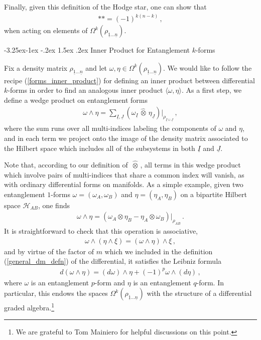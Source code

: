 \documentclass[12pt]{article}
\makeatletter
\newcommand{\ul}[1]{{\underline{#1}}}
\renewcommand\subsection{\@startsection{subsection}{2}{\z@}%
                                     {-3.25ex\@plus -1ex \@minus -.2ex}%
                                     {1.5ex \@plus .2ex}%
                                     {\normalfont\bfseries}}
\newcommand{\wotimes}{ \, \widehat{\otimes} \, }
\numberwithin{equation}{section}
\newcommand{\rhooneton}{{\rho_{\ul{1} \ldots \ul{n}}}}
\makeatother
\begin{document}
Finally, given this definition of the Hodge star, one can show that
%
\begin{align}
    \ast \ast = ( -1 )^{k ( n - k )} \, ,
\end{align}
%
when acting on elements of $\Omega^k ( \rhooneton )$.

\subsection{Inner Product for Entanglement $k$-forms}

Fix a density matrix $\rhooneton$ and let $\omega, \eta \in \Omega^k ( \rhooneton )$. We would like to follow the recipe (\ref{forms_inner_product}) for defining an inner product between differential $k$-forms in order to find an analogous inner product $\langle \omega , \eta \rangle$. As a first step, we define a wedge product on entanglement forms
%
\begin{align}
    \omega \wedge \eta = \sum_{\ul{I} , \ul{J}} \left( \omega_{\ul{I}} \wotimes \eta_{\ul{J}} \right) \big\vert_{\rho_{\ul{I} \cup \ul{J} }} \, ,
\end{align}
%
where the sum runs over all multi-indices labeling the components of $\omega$ and $\eta$, and in each term we project onto the image of the density matrix associated to the Hilbert space which includes all of the subsystems in both $\ul{I}$ and $\ul{J}$.

Note that, according to our definition of $\wotimes$, all terms in this wedge product which involve pairs of multi-indices that share a common index will vanish, as with ordinary differential forms on manifolds. As a simple example, given two entanglement $1$-forms $\omega = ( \omega_A , \omega_B )$ and $\eta = ( \eta_A , \eta_B )$ on a bipartite Hilbert space $\mathcal{H}_{AB}$, one finds
%
\begin{align}
    \omega \wedge \eta = \left( \omega_A \otimes \eta_B - \eta_A \otimes \omega_B \right) \big\vert_{\rho_{AB}} \, .
\end{align}
%
It is straightforward to check that this operation is associative,
%
\begin{align}
    \omega \wedge \left( \eta \wedge \xi \right) = \left( \omega \wedge \eta \right) \wedge \xi \, ,
\end{align}
%
and by virtue of the factor of $m$ which we included in the definition (\ref{general_dm_defn}) of the differential, it satisfies the Leibniz formula
%
\begin{align}
    d \left( \omega \wedge \eta \right) = ( d \omega ) \wedge \eta + ( - 1 )^p \omega \wedge ( d \eta ) \, ,
\end{align}
%
where $\omega$ is an entanglement $p$-form and $\eta$ is an entanglement $q$-form. In particular, this endows the spaces $\Omega^k ( \rhooneton )$ with the structure of a differential graded algebra.\footnote{We are grateful to Tom Mainiero for helpful discussions on this point.}
\end{document}
